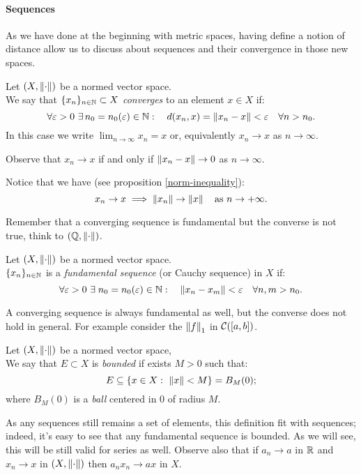 \paragraph{Sequences} As we have done at the beginning with metric spaces, having define a notion of distance allow us to discuss about sequences and their convergence in those new spaces.
\begin{defn}
	Let $(X,\left\lVert\cdot\right\rVert)$ be a normed vector space.\\
	We say that $\{x_n\}_{n \in \mathbb N}\subset X$ \emph{converges} to an element $x\in X$ if:
	$$
		\forall \varepsilon > 0 \ 
		\exists \, n_0 = n_0(\eps) \in \NN : \quad
		d(x_n, x) = \norm{x_n-x} < \varepsilon \quad
		\forall n > n_0
		.
	$$
	In this case we write $\lim_{n \to \infty}x_n = x$ or, equivalently $x_n \to x$ as $n \to \infty$.
\end{defn}

Observe that $x_n \to x$ if and only if $\left\lVert x_n - x\right\rVert \to 0$ as $n \to \infty$.

Notice that we have (see proposition \vref{norm-inequality}):
$$
	x_n \to x 
	\implies \left\lVert x_n\right\rVert \to \left\lVert x\right\rVert 
	\quad \text{as } n \to +\infty
.
$$

Remember that a converging sequence is fundamental but the converse is not true, think to $(\mathbb Q, \left\lVert\cdot\right\rVert)$.

\begin{defn}
	Let $(X,\left\lVert\cdot\right\rVert)$ be a normed vector space.\\
	$\{x_n\}_{n\in\mathbb N}$ is a \emph{fundamental sequence} (or Cauchy sequence) in $X$ if: $$\forall \varepsilon > 0 \ \exists\; n_0=n_0(\varepsilon)\in \mathbb N : \quad
	\left\lVert x_n-x_m\right\rVert < \varepsilon \quad \forall n,m > n_0.$$
\end{defn}

A converging sequence is always fundamental as well, but the converse does not hold in general. For example consider the $\left\lVert f\right\rVert_1$ in $\mathcal C([a,b])$.

\begin{defn}
	Let $(X,\left\lVert\cdot\right\rVert)$ be a normed vector space, \\
	We say that $E \subset X$ is \emph{bounded} if exists $M >0$ such that:
	$$E\subseteq \{x\in X: \ \left\lVert x\right\rVert < M \} = B_M(0);$$
	where $B_M(0)$ is a \emph{ball} centered in $0$ of radius $M$.
\end{defn}

As any sequences still remains a set of elements, this definition fit with sequences; indeed, it's easy to see that any fundamental sequence is bounded. As we will see, this will be still valid for series as well.
Observe also that if $a_n \to a$ in $\mathbb R$ and $x_n \to x$ in $(X, \left\lVert\cdot\right\rVert)$ then $a_n x_n \to a x$ in $X$.


